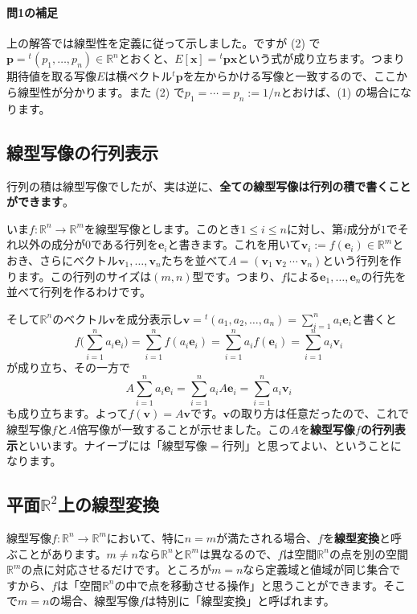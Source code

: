 \paragraph{問1の補足}
上の解答では線型性を定義に従って示しました。ですが (2) で$\bm{p} = {}^t (p_1, \ldots, p_n)\in\mathbb{R}^n$とおくと、$E[\bm{x}] = {}^t \bm{p}\bm{x}$という式が成り立ちます。つまり期待値を取る写像$E$は横ベクトル${}^t \bm{p}$を左からかける写像と一致するので、ここから線型性が分かります。また (2) で$p_1 = \cdots = p_n := 1/n$とおけば、(1) の場合になります。

\subsection{線型写像の行列表示}

行列の積は線型写像でしたが、実は逆に、\textbf{全ての線型写像は行列の積で書くことができます}。

いま$f\colon \mathbb{R}^n \rightarrow \mathbb{R}^m$を線型写像とします。このとき$1\leq i\leq n$に対し、第$i$成分が$1$でそれ以外の成分が$0$である行列を$\bm{e}_i$と書きます。これを用いて$\bm{v}_i :=f(\bm{e}_i)\in\mathbb{R}^m$とおき、さらにベクトル$\bm{v}_1,\ldots,\bm{v}_n$たちを並べて$A = (\bm{v}_1 \  \bm{v}_2 \  \cdots \ \bm{v}_n)$という行列を作ります。この行列のサイズは$(m,n)$型です。つまり、$f$による$\bm{e}_1,\ldots,\bm{e}_n$の行先を並べて行列を作るわけです。

そして$\mathbb{R}^n$のベクトル$\bm{v}$を成分表示し$\bm{v} = {}^t (a_1, a_2, \ldots, a_n) = \sum_{i = 1}^n a_i \bm{e}_i$と書くと
\[
f\biggl(\sum_{i = 1}^n  a_i \bm{e}_i \biggr) = \sum_{i = 1}^n  f( a_i \bm{e}_i ) = \sum_{i = 1}^n  a_i f(\bm{e}_i) = \sum_{i = 1}^n  a_i \bm{v}_i
\]
が成り立ち、その一方で
\[
A\sum_{i = 1}^n  a_i \bm{e}_i = \sum_{i = 1}^n  a_i A\bm{e}_i = \sum_{i = 1}^n  a_i \bm{v}_i
\]
も成り立ちます。よって$f(\bm{v}) = A\bm{v}$です。$\bm{v}$の取り方は任意だったので、これで線型写像$f$と$A$倍写像が一致することが示せました。この$A$を\textbf{線型写像$f$の行列表示}といいます。ナイーブには「線型写像$=$行列」と思ってよい、ということになります。

\subsection{平面$\mathbb{R}^2$上の線型変換}

線型写像$f\colon \mathbb{R}^n\rightarrow\mathbb{R}^m$において、特に$n = m$が満たされる場合、$f$を\textbf{線型変換}と呼ぶことがあります。$m \neq n$なら$\mathbb{R}^n$と$\mathbb{R}^m$は異なるので、$f$は空間$\mathbb{R}^n$の点を別の空間$\mathbb{R}^m$の点に対応させるだけです。ところが$m = n$なら定義域と値域が同じ集合ですから、$f$は「空間$\mathbb{R}^n$の中で点を移動させる操作」と思うことができます。そこで$m = n$の場合、線型写像$f$は特別に「線型変換」と呼ばれます。


